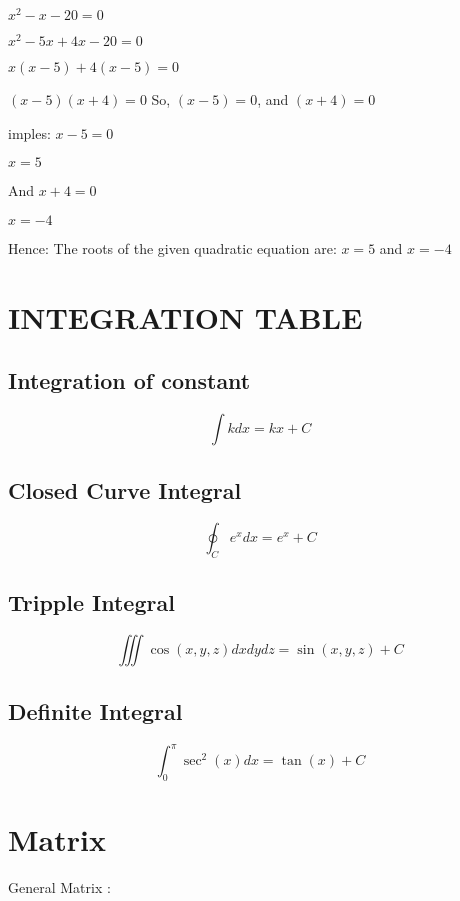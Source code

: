 \documentclass{article}
\begin{document}
$x^2-x-20=0$

$x^2-5x+4x-20=0$

$x(x-5)+4(x-5)=0$

$(x-5)(x+4)=0$
So, 
$(x-5) =0$, and $(x+4) =0$

imples:
$x-5 = 0$

$x = 5$

And $ x+4 = 0$

$x =-4$

Hence:
The roots of the given quadratic equation are:
$x=5$ and $ x=-4$

\section{INTEGRATION TABLE}
\cite{7}
\subsection{Integration of constant}
\begin{equation*}
	\int k  dx = kx + C
\end{equation*}

\subsection{Closed Curve Integral}
\begin{equation*}
	\oint_C e^x dx = e^x + C
\end{equation*}

\subsection{Tripple Integral}
\begin{equation*}
	\iiint \cos(x,y,z) dx dy dz = \sin(x,y,z) + C
\end{equation*}

\subsection{Definite Integral}
\begin{equation*}
	\int_0^{\pi} \sec^2(x) dx = \tan(x) + C
\end{equation*}


\section{Matrix}

General Matrix : 
\end{document}
